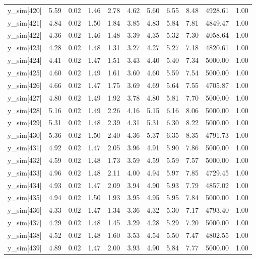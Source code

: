 \begin{table}[ht]
\begin{tabular}{rrrrrrrrrrr}
  y\_sim[420] & 5.59 & 0.02 & 1.46 & 2.78 & 4.62 & 5.60 & 6.55 & 8.48 & 4928.61 & 1.00 \\ 
  y\_sim[421] & 4.84 & 0.02 & 1.50 & 1.84 & 3.85 & 4.83 & 5.84 & 7.81 & 4849.47 & 1.00 \\ 
  y\_sim[422] & 4.36 & 0.02 & 1.46 & 1.48 & 3.39 & 4.35 & 5.32 & 7.30 & 4058.64 & 1.00 \\ 
  y\_sim[423] & 4.28 & 0.02 & 1.48 & 1.31 & 3.27 & 4.27 & 5.27 & 7.18 & 4820.61 & 1.00 \\ 
  y\_sim[424] & 4.41 & 0.02 & 1.47 & 1.51 & 3.43 & 4.40 & 5.40 & 7.34 & 5000.00 & 1.00 \\ 
  y\_sim[425] & 4.60 & 0.02 & 1.49 & 1.61 & 3.60 & 4.60 & 5.59 & 7.54 & 5000.00 & 1.00 \\ 
  y\_sim[426] & 4.66 & 0.02 & 1.47 & 1.75 & 3.69 & 4.69 & 5.64 & 7.55 & 4705.87 & 1.00 \\ 
  y\_sim[427] & 4.80 & 0.02 & 1.49 & 1.92 & 3.78 & 4.80 & 5.81 & 7.70 & 5000.00 & 1.00 \\ 
  y\_sim[428] & 5.16 & 0.02 & 1.49 & 2.26 & 4.16 & 5.15 & 6.16 & 8.06 & 5000.00 & 1.00 \\ 
  y\_sim[429] & 5.31 & 0.02 & 1.48 & 2.39 & 4.31 & 5.31 & 6.30 & 8.22 & 5000.00 & 1.00 \\ 
  y\_sim[430] & 5.36 & 0.02 & 1.50 & 2.40 & 4.36 & 5.37 & 6.35 & 8.35 & 4791.73 & 1.00 \\ 
  y\_sim[431] & 4.92 & 0.02 & 1.47 & 2.05 & 3.96 & 4.91 & 5.90 & 7.86 & 5000.00 & 1.00 \\ 
  y\_sim[432] & 4.59 & 0.02 & 1.48 & 1.73 & 3.59 & 4.59 & 5.59 & 7.57 & 5000.00 & 1.00 \\ 
  y\_sim[433] & 4.96 & 0.02 & 1.48 & 2.11 & 4.00 & 4.94 & 5.97 & 7.85 & 4729.45 & 1.00 \\ 
  y\_sim[434] & 4.93 & 0.02 & 1.47 & 2.09 & 3.94 & 4.90 & 5.93 & 7.79 & 4857.02 & 1.00 \\ 
  y\_sim[435] & 4.94 & 0.02 & 1.50 & 1.93 & 3.95 & 4.95 & 5.95 & 7.84 & 5000.00 & 1.00 \\ 
  y\_sim[436] & 4.33 & 0.02 & 1.47 & 1.34 & 3.36 & 4.32 & 5.30 & 7.17 & 4793.40 & 1.00 \\ 
  y\_sim[437] & 4.29 & 0.02 & 1.48 & 1.45 & 3.29 & 4.28 & 5.29 & 7.20 & 5000.00 & 1.00 \\ 
  y\_sim[438] & 4.52 & 0.02 & 1.48 & 1.60 & 3.53 & 4.54 & 5.50 & 7.47 & 4802.55 & 1.00 \\ 
  y\_sim[439] & 4.89 & 0.02 & 1.47 & 2.00 & 3.93 & 4.90 & 5.84 & 7.77 & 5000.00 & 1.00 \\ 

\end{tabular}
\end{table}
